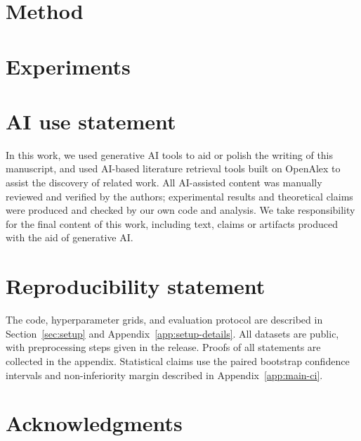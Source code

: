 \documentclass{article} %
\theoremstyle{plain}
\theoremstyle{remark}
\begin{document}
\section{Method}

\section{Experiments}
\label{sec:experiments}


\section*{AI use statement}
In this work, we used generative AI tools to aid or polish the writing of this
manuscript, and used AI-based literature retrieval tools built on OpenAlex to
assist the discovery of related work. All AI-assisted content was manually
reviewed and verified by the authors; experimental results and theoretical
claims were produced and checked by our own code and analysis. We take
responsibility for the final content of this work, including text, claims or
artifacts produced with the aid of generative AI.

\section*{Reproducibility statement}

The code, hyperparameter grids, and evaluation protocol are described in
Section~\ref{sec:setup} and Appendix~\ref{app:setup-details}.
All datasets are public, with preprocessing steps given in the release. Proofs
of all statements are collected in the appendix. Statistical claims use the
paired bootstrap confidence intervals and non-inferiority margin described in
Appendix~\ref{app:main-ci}.

\section*{Acknowledgments}


\clearpage



\clearpage
\appendix





\end{document}
